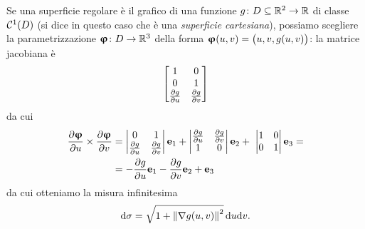 Se una superficie regolare è il grafico di una funzione $g\colon D\subseteq\mathbb{R}^2\to\mathbb{R}$ di classe $\mathcal{C}^{{1}}(D)$ (si dice in questo caso che è una \emph{superficie cartesiana}), possiamo scegliere la parametrizzazione $\bm{\upvarphi}\colon D\to\mathbb{R}^3$ della forma $\bm{\upvarphi}(u,v)=\big(u,v,g(u,v)\big)$: la matrice jacobiana è
\begin{equation}
	\begin{bmatrix}
		1&0\\
		0&1\\
		\frac{\partial {g}}{\partial {u}}&\frac{\partial {g}}{\partial {v}}
	\end{bmatrix}
\end{equation}
da cui
\begin{equation}
	\begin{split}
		\frac{\partial {\bm{\upvarphi}}}{\partial {u}}\times\frac{\partial {\bm{\upvarphi}}}{\partial {v}}&=
		\begin{vmatrix}
			0&1\\
			\frac{\partial {g}}{\partial {u}}&\frac{\partial {g}}{\partial {v}}
		\end{vmatrix}
		\mathbf{e}_1+
		\begin{vmatrix}
			\frac{\partial {g}}{\partial {u}}&\frac{\partial {g}}{\partial {v}}\\
			1&0
		\end{vmatrix}
		\mathbf{e}_2+\
		\begin{vmatrix}
			1&0\\
			0&1
		\end{vmatrix}
		\mathbf{e}_3=\\
		&=-\frac{\partial {g}}{\partial {u}}\mathbf{e}_1-\frac{\partial {g}}{\partial {v}}\mathbf{e}_2+\mathbf{e}_3
	\end{split}
	\label{eq:versore-normale-superficie-cartesiana}
\end{equation}
da cui otteniamo la misura infinitesima
\begin{equation}
	\textup{d}\sigma=\sqrt{1+\left\|{\nabla g(u,v)}\right\|^2}\,\textup{d} u\textup{d} v.
\end{equation}

